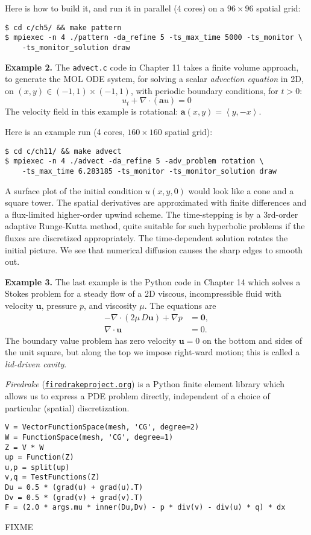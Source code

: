 \documentclass[12pt]{amsart}
\newcommand{\bu}{\mathbf{u}}
\newcommand{\Div}{\nabla\cdot}
\newcommand{\grad}{\nabla}
\begin{document}
Here is how to build it, and run it in parallel (4 cores) on a $96\times 96$ spatial grid:

\medskip
\begin{Verbatim}[fontsize=\small]
$ cd c/ch5/ && make pattern
$ mpiexec -n 4 ./pattern -da_refine 5 -ts_max_time 5000 -ts_monitor \
    -ts_monitor_solution draw
\end{Verbatim}

\bigskip
\noindent \textbf{Example 2.}  The \texttt{advect.c} code in Chapter 11 takes a finite volume approach, to generate the MOL ODE system, for solving a scalar \emph{advection equation} in 2D, on $(x,y) \in (-1,1)\times (-1,1)$, with periodic boundary conditions, for $t>0$:
    $$u_t + \nabla \cdot (\mathbf{a} u) = 0$$
The velocity field in this example is rotational: $\mathbf{a}(x,y) = \left<y, -x\right>$.

Here is an example run (4 cores, $160\times 160$ spatial grid):

\medskip
\begin{Verbatim}[fontsize=\small]
$ cd c/ch11/ && make advect
$ mpiexec -n 4 ./advect -da_refine 5 -adv_problem rotation \
    -ts_max_time 6.283185 -ts_monitor -ts_monitor_solution draw
\end{Verbatim}

\medskip
A surface plot of the initial condition $u(x,y,0)$ would look like a cone and a square tower.  The spatial derivatives are approximated with finite differences and a flux-limited higher-order upwind scheme.  The time-stepping is by a 3rd-order adaptive Runge-Kutta method, quite suitable for such hyperbolic problems if the fluxes are discretized appropriately.  The time-dependent solution rotates the initial picture.  We see that numerical diffusion causes the sharp edges to smooth out.  

\bigskip
\noindent \textbf{Example 3.}  The last example is the Python code in Chapter 14 which solves a Stokes problem for a steady flow of a 2D viscous, incompressible fluid with velocity $\bu$, pressure $p$, and viscosity $\mu$.  The equations are
\begin{align*}
- \Div \left(2 \mu\, D \bu\right) + \grad p &= \bm{0}, \\
\Div \bu &= 0.
\end{align*}
The boundary value problem has zero velocity $\bu=0$ on the bottom and sides of the unit square, but along the top we impose right-ward motion; this is called a \emph{lid-driven cavity}.

\emph{Firedrake} (\href{https://www.firedrakeproject.org/}{\texttt{firedrakeproject.org}}) is a Python finite element library which allows us to express a PDE problem directly, independent of a choice of particular (spatial) discretization.

\medskip
\begin{Verbatim}[fontsize=\small]
V = VectorFunctionSpace(mesh, 'CG', degree=2)
W = FunctionSpace(mesh, 'CG', degree=1)
Z = V * W
up = Function(Z)
u,p = split(up)
v,q = TestFunctions(Z)
Du = 0.5 * (grad(u) + grad(u).T)
Dv = 0.5 * (grad(v) + grad(v).T)
F = (2.0 * args.mu * inner(Du,Dv) - p * div(v) - div(u) * q) * dx
\end{Verbatim}

FIXME
\end{document}
